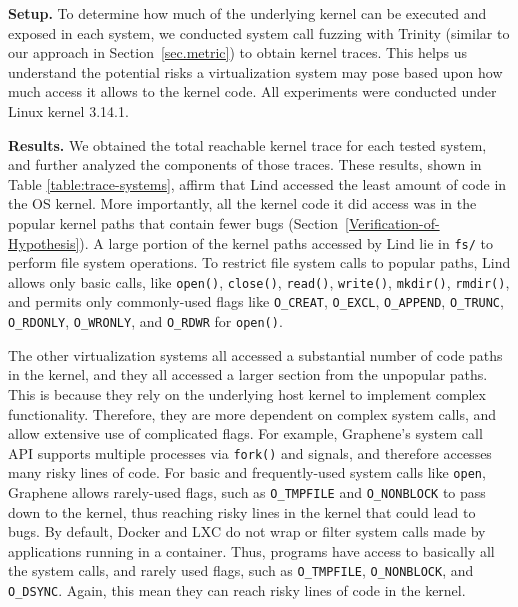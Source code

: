 {{{\noindent
\textbf{Setup.}
To determine how much of the underlying kernel can be executed and exposed in
each system,
we conducted system call fuzzing with Trinity (similar to our approach in
Section~{\ref{sec.metric}}) to obtain
kernel traces. This helps us understand the potential risks a virtualization system
may pose based upon how much access it allows to the kernel code.
All experiments were conducted under Linux kernel 3.14.1.

\noindent
\textbf{Results.}
We obtained the total reachable kernel trace for
each tested system,
and further analyzed the components of those traces. These results,
shown in Table \ref{table:trace-systems}, affirm that Lind accessed the
least amount of code in the OS
kernel. More importantly, all the kernel code it did access was in the
popular kernel paths that contain fewer bugs (Section~{\ref{Verification-of-Hypothesis}}).
A large portion of the kernel paths accessed by Lind lie in
\texttt{fs/} to perform file system operations.
To restrict file system calls to popular paths, Lind allows only basic calls,
like \texttt{open()}, \texttt{close()}, \texttt{read()}, \texttt{write()}, \texttt{mkdir()},
\texttt{rmdir()}, and permits only commonly-used flags like \texttt{O\_CREAT}, \texttt{O\_EXCL},
 \texttt{O\_APPEND}, \texttt{O\_TRUNC},
\texttt{O\_RDONLY}, \texttt{O\_WRONLY}, and \texttt{O\_RDWR}
for \texttt{open()}.

The other virtualization systems all accessed a substantial number of code
paths in the kernel, and they all accessed a larger section from the unpopular
paths. This is because they rely on the underlying host kernel to implement
complex functionality. Therefore, they are more dependent on complex system
calls, and allow extensive use of complicated flags.  For example, Graphene's
system call API supports multiple processes via \texttt{fork()} and signals,
and therefore accesses many risky lines of code. 
For basic and frequently-used system calls like \texttt{open},
Graphene allows rarely-used flags, such as \texttt{O\_TMPFILE} and \texttt{O\_NONBLOCK}
to pass down to the kernel, thus reaching risky lines in the kernel that could lead to bugs.
By default, Docker and LXC do not wrap or filter system calls made by applications running in a container.
Thus, programs have access to basically all the system calls, and rarely used flags, such as \texttt{O\_TMPFILE},
\texttt{O\_NONBLOCK}, and \texttt{O\_DSYNC}. Again, this mean they can reach risky lines of code in the kernel.

}}}
